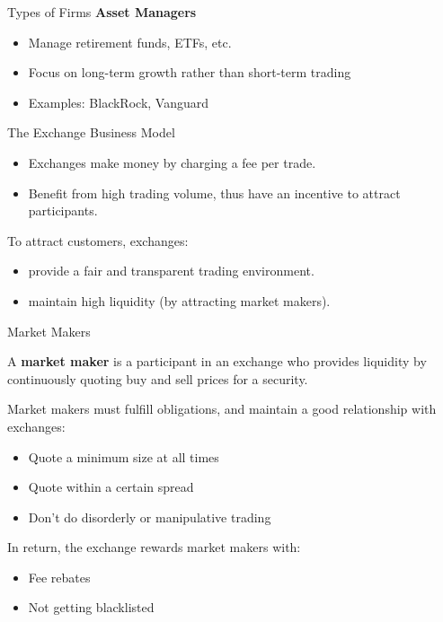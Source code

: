 \begin{frame}{Types of Firms}
  \textbf{Asset Managers}
  \begin{itemize}
    \item Manage retirement funds, ETFs, etc.
    \item Focus on long-term growth rather than short-term trading
    \item Examples: BlackRock, Vanguard
  \end{itemize}
\end{frame}

\begin{frame}{The Exchange Business Model}
  \begin{itemize}
    \item Exchanges make money by charging a fee per trade.
    \item Benefit from high trading volume, thus have an incentive to attract participants.
  \end {itemize}

  \begin{sqt:result}
    To attract customers, exchanges:
    \begin{itemize}
      \item provide a fair and transparent trading environment.
      \item maintain high liquidity (by attracting market makers).
    \end{itemize}
  \end{sqt:result}
\end{frame}

\begin{frame}{Market Makers}
  \begin{sqt:definition}
    A \textbf{market maker} is a participant in an exchange who provides liquidity by continuously quoting buy and sell prices for a security.
  \end{sqt:definition}

  Market makers must fulfill obligations, and maintain a good relationship with exchanges:

  \begin{itemize}
    \item Quote a minimum size at all times
    \item Quote within a certain spread
    \item Don't do disorderly or manipulative trading
  \end{itemize}

  In return, the exchange rewards market makers with:

  \begin{itemize}
    \item Fee rebates
    \item Not getting blacklisted
  \end{itemize}
\end{frame}

